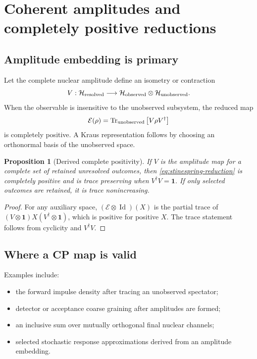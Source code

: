 \documentclass[11pt]{article}
\newtheorem{proposition}[definition]{Proposition}
\newcommand{\Tr}{\operatorname{Tr}}
\newcommand{\Id}{\operatorname{Id}}
\newcommand{\Hil}{\mathcal H}
\newcommand{\cE}{\mathcal E}
\newcommand{\bbone}{\bm 1}
\begin{document}
\section{Coherent amplitudes and completely positive reductions}
\label{sec:cp-reductions}

\subsection{Amplitude embedding is primary}

Let the complete nuclear amplitude define an isometry or contraction
\begin{equation}
 V:\Hil_{\rm resolved}\longrightarrow
 \Hil_{\rm observed}\otimes\Hil_{\rm unobserved}.
\label{eq:stinespring-embedding}
\end{equation}
When the observable is insensitive to the unobserved subsystem, the reduced
map
\begin{equation}
 \cE(\rho)
 =\Tr_{\rm unobserved}\left[V\rho V^\dagger\right]
\label{eq:stinespring-reduction}
\end{equation}
is completely positive.  A Kraus representation follows by choosing an
orthonormal basis of the unobserved space.

\begin{proposition}[Derived complete positivity]
\label{prop:derived-cp}
If \(V\) is the amplitude map for a complete set of retained unresolved
outcomes, then \cref{eq:stinespring-reduction} is completely positive and is
trace preserving when \(V^\dagger V=\bbone\).  If only selected outcomes are
retained, it is trace nonincreasing.
\end{proposition}

\begin{proof}
For any auxiliary space, \((\cE\otimes\Id)(X)\) is the partial trace of
\((V\otimes\bbone)X(V^\dagger\otimes\bbone)\), which is positive for positive
\(X\).  The trace statement follows from cyclicity and \(V^\dagger V\).
\end{proof}

\subsection{Where a CP map is valid}

Examples include:
\begin{itemize}
\item the forward impulse density after tracing an unobserved spectator;
\item detector or acceptance coarse graining after amplitudes are formed;
\item an inclusive sum over mutually orthogonal final nuclear channels;
\item selected stochastic response approximations derived from an amplitude
      embedding.
\end{itemize}
\end{document}
